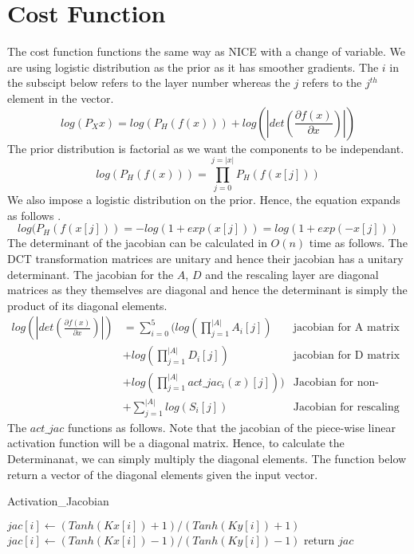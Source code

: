 \documentclass{article}
\begin{document}
\section{Cost Function}
The cost function functions the same way as NICE with a change of variable. We are using logistic distribution as the prior as it has smoother gradients. The $i$ in the subscipt below refers to the layer number whereas the $j$ refers to the $j^{th}$ element in the vector.
$$log(P_X{x}) = log(P_H(f(x))) + log(|det(\frac{\partial f(x)}{\partial x})|)$$
The prior distribution is factorial as we want the components to be independant.
  $$ log(P_H(f(x))) = \prod_{j=0}^{j=|x|} P_H(f(x[j]))$$
We also impose a logistic distribution on the prior. Hence, the equation expands as follows .
$$ log(P_H(f(x[j])) = -log(1+exp(x[j])) = log(1+exp(-x[j])) $$
The determinant of the jacobian can be calculated in $O(n)$ time as follows. The DCT transformation matrices are unitary and hence their jacobian has a unitary determinant. The jacobian for the $A$, $D$ and the rescaling layer are diagonal matrices as they themselves are diagonal and hence the determinant is simply the product of its diagonal elements.
\begin{align*}
  log(|det(\frac{\partial f(x)}{\partial x})|)  &=  \sum_{i=0}^5 (log(\prod_{j=1}^{|A|} A_i[j])  &\text{jacobian for A matrix}\\
& + log(\prod_{j=1}^{|A|} D_i[j]) & \text{jacobian for D matrix}\\ 
& + log(\prod_{j=1}^{|A|} act\_jac_i(x)[j]))  & \text{Jacobian for non-linearity}\\
& + \sum_{j=1}^{|A|} log(S_i[j]) & \text{Jacobian for rescaling}
\end{align*}
 The $act\_jac$ functions as follows. Note that the jacobian of the piece-wise linear activation function will be a diagonal matrix. Hence, to calculate the Determinanat, we can simply multiply the diagonal elements. The function below return a vector of the diagonal elements given the input vector. 
\begin{algorithm}
  \caption{Activation\_Jacobian}\label{jac}
  \begin{algorithmic}[1]
     
    \State $jac[i]  \gets (Tanh(Kx[i])+1)/(Tanh(Ky[i])+1)   $
    \Else 
    \State $jac[i]  \gets (Tanh(Kx[i])-1)/(Tanh(Ky[i])-1) $
    \EndIf
    \EndFor
    \State return $jac$
    \EndProcedure
  \end{algorithmic}
\end{algorithm}
\end{document}
